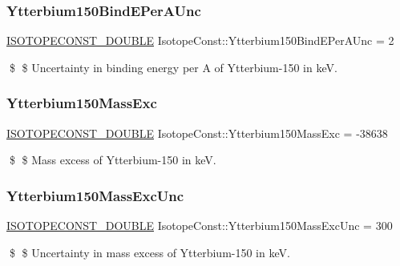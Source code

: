 \subsubsection{\texorpdfstring{Ytterbium150\+Bind\+E\+Per\+A\+Unc}{Ytterbium150BindEPerAUnc}}
{\footnotesize\ttfamily \mbox{\hyperlink{group___isotope_const-_macros_ga8f45a7272ce02c0b4c65c44636ed719a}{I\+S\+O\+T\+O\+P\+E\+C\+O\+N\+S\+T\+\_\+\+D\+O\+U\+B\+LE}} Isotope\+Const\+::\+Ytterbium150\+Bind\+E\+Per\+A\+Unc = 2}

\$ \$ Uncertainty in binding energy per A of Ytterbium-\/150 in keV. \mbox{\label{group___isotope_const-_ytterbium-_yb150_ga06f54392c2b3b385f5cfcc57ecbf0f6c}} 
\subsubsection{\texorpdfstring{Ytterbium150\+Mass\+Exc}{Ytterbium150MassExc}}
{\footnotesize\ttfamily \mbox{\hyperlink{group___isotope_const-_macros_ga8f45a7272ce02c0b4c65c44636ed719a}{I\+S\+O\+T\+O\+P\+E\+C\+O\+N\+S\+T\+\_\+\+D\+O\+U\+B\+LE}} Isotope\+Const\+::\+Ytterbium150\+Mass\+Exc = -\/38638}

\$ \$ Mass excess of Ytterbium-\/150 in keV. \mbox{\label{group___isotope_const-_ytterbium-_yb150_gafcd26999de8bec5dfbbc41c7b0c7c8d4}} 
\subsubsection{\texorpdfstring{Ytterbium150\+Mass\+Exc\+Unc}{Ytterbium150MassExcUnc}}
{\footnotesize\ttfamily \mbox{\hyperlink{group___isotope_const-_macros_ga8f45a7272ce02c0b4c65c44636ed719a}{I\+S\+O\+T\+O\+P\+E\+C\+O\+N\+S\+T\+\_\+\+D\+O\+U\+B\+LE}} Isotope\+Const\+::\+Ytterbium150\+Mass\+Exc\+Unc = 300}

\$ \$ Uncertainty in mass excess of Ytterbium-\/150 in keV. \mbox{\label{group___isotope_const-_ytterbium-_yb150_ga5eef4fe7fe870a9bf9ad673d20f9834d}} 
